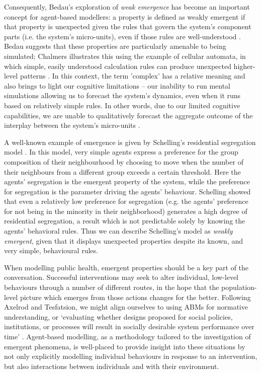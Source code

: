 \documentclass[review]{elsarticle}
\begin{document}
Consequently, Bedau's exploration of \emph{weak emergence} has become an important concept for agent-based modellers: a property is defined as weakly emergent if that property is unexpected given the rules that govern the system's component parts (i.e. the system's micro-units), even if those rules are well-understood \citep{bedau97b}.  Bedau suggests that these properties are particularly amenable to being simulated; Chalmers illustrates this using the example of cellular automata, in which simple, easily understood calculation rules can produce unexpected higher-level patterns \citep{chalmers2006}. In this context, the term 'complex' has a relative meaning and also brings to light our cognitive limitations -- our inability to run mental simulations allowing us to forecast the system's dynamics, even when it runs based on relatively simple rules. In other words, due to our limited cognitive capabilities, we are unable to qualitatively forecast the aggregate outcome of the interplay between the system's micro-units \citep{berkman2011}.

A well-known example of emergence is given by Schelling's residential segregation model \citep{schelling71, schelling78}. In this model, very simple agents express a preference for the group composition of their neighbourhood by choosing to move when the number of their neighbours from a different group exceeds a certain threshold.  Here the agents' segregation is the emergent property of the system, while the preference for segregation is the parameter driving the agents' behaviour. Schelling showed that even a relatively low preference for segregation (e.g. the agents' preference for not being in the minority in their neighborhood) generates a high degree of residential segregation, a result which is not predictable solely by knowing the agents' behavioral rules.  Thus we can describe Schelling's model as \emph{weakly emergent}, given that it displays unexpected properties despite its known, and very simple, behavioural rules.

When modelling public health, emergent properties should be a key part of the conversation.  Successful interventions may seek to alter individual, low-level behaviours through a number of different routes, in the hope that the population-level picture which emerges from those actions changes for the better.  Following Axelrod and Tesfatsion, we might align ourselves to using ABMs for normative understanding, or `evaluating whether designs proposed for social policies, institutions, or processes will result in socially desirable system performance over time' \citep{axelrod05}.  Agent-based modelling, as a methodology tailored to the investigation of emergent phenomena, is well-placed to provide insight into these situations by not only explicitly modelling individual behaviours in response to an intervention, but also interactions between individuals and with their environment.
\end{document}
